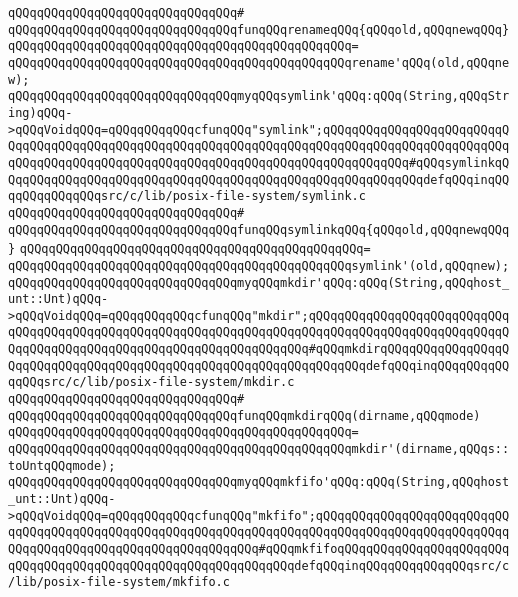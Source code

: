 \verb|qQQqqQQqqQQqqQQqqQQqqQQqqQQqqQQq#|\newline
\verb|qQQqqQQqqQQqqQQqqQQqqQQqqQQqqQQqfunqQQqrenameqQQq{qQQqold,qQQqnewqQQq}|\newline
\verb|qQQqqQQqqQQqqQQqqQQqqQQqqQQqqQQqqQQqqQQqqQQqqQQq=|\newline
\verb|qQQqqQQqqQQqqQQqqQQqqQQqqQQqqQQqqQQqqQQqqQQqqQQqrename'qQQq(old,qQQqnew);|\newline
\newline
\newline
\verb|qQQqqQQqqQQqqQQqqQQqqQQqqQQqqQQqmyqQQqsymlink'qQQq:qQQq(String,qQQqString)qQQq->qQQqVoidqQQq=qQQqqQQqqQQqcfunqQQq"symlink";qQQqqQQqqQQqqQQqqQQqqQQqqQQqqQQqqQQqqQQqqQQqqQQqqQQqqQQqqQQqqQQqqQQqqQQqqQQqqQQqqQQqqQQqqQQqqQQqqQQqqQQqqQQqqQQqqQQqqQQqqQQqqQQqqQQqqQQqqQQqqQQqqQQqqQQq#qQQqsymlinkqQQqqQQqqQQqqQQqqQQqqQQqqQQqqQQqqQQqqQQqqQQqqQQqqQQqqQQqqQQqdefqQQqinqQQqqQQqqQQqqQQqsrc/c/lib/posix-file-system/symlink.c|\newline
\verb|qQQqqQQqqQQqqQQqqQQqqQQqqQQqqQQq#|\newline
\verb|qQQqqQQqqQQqqQQqqQQqqQQqqQQqqQQqfunqQQqsymlinkqQQq{qQQqold,qQQqnewqQQq}|\newline
\verb|qQQqqQQqqQQqqQQqqQQqqQQqqQQqqQQqqQQqqQQqqQQqqQQq=|\newline
\verb|qQQqqQQqqQQqqQQqqQQqqQQqqQQqqQQqqQQqqQQqqQQqqQQqsymlink'(old,qQQqnew);|\newline
\newline
\newline
\verb|qQQqqQQqqQQqqQQqqQQqqQQqqQQqqQQqmyqQQqmkdir'qQQq:qQQq(String,qQQqhost_unt::Unt)qQQq->qQQqVoidqQQq=qQQqqQQqqQQqcfunqQQq"mkdir";qQQqqQQqqQQqqQQqqQQqqQQqqQQqqQQqqQQqqQQqqQQqqQQqqQQqqQQqqQQqqQQqqQQqqQQqqQQqqQQqqQQqqQQqqQQqqQQqqQQqqQQqqQQqqQQqqQQqqQQqqQQqqQQqqQQqqQQqqQQq#qQQqmkdirqQQqqQQqqQQqqQQqqQQqqQQqqQQqqQQqqQQqqQQqqQQqqQQqqQQqqQQqqQQqqQQqqQQqdefqQQqinqQQqqQQqqQQqqQQqsrc/c/lib/posix-file-system/mkdir.c|\newline
\verb|qQQqqQQqqQQqqQQqqQQqqQQqqQQqqQQq#|\newline
\verb|qQQqqQQqqQQqqQQqqQQqqQQqqQQqqQQqfunqQQqmkdirqQQq(dirname,qQQqmode)|\newline
\verb|qQQqqQQqqQQqqQQqqQQqqQQqqQQqqQQqqQQqqQQqqQQqqQQq=|\newline
\verb|qQQqqQQqqQQqqQQqqQQqqQQqqQQqqQQqqQQqqQQqqQQqqQQqmkdir'(dirname,qQQqs::toUntqQQqmode);|\newline
\newline
\newline
\verb|qQQqqQQqqQQqqQQqqQQqqQQqqQQqqQQqmyqQQqmkfifo'qQQq:qQQq(String,qQQqhost_unt::Unt)qQQq->qQQqVoidqQQq=qQQqqQQqqQQqcfunqQQq"mkfifo";qQQqqQQqqQQqqQQqqQQqqQQqqQQqqQQqqQQqqQQqqQQqqQQqqQQqqQQqqQQqqQQqqQQqqQQqqQQqqQQqqQQqqQQqqQQqqQQqqQQqqQQqqQQqqQQqqQQqqQQqqQQqqQQqqQQq#qQQqmkfifoqQQqqQQqqQQqqQQqqQQqqQQqqQQqqQQqqQQqqQQqqQQqqQQqqQQqqQQqqQQqqQQqdefqQQqinqQQqqQQqqQQqqQQqsrc/c/lib/posix-file-system/mkfifo.c|\newline

